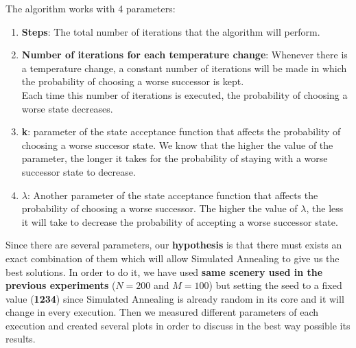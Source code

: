 \documentclass[12]{article}
\begin{document}
The algorithm works with 4 parameters:
\begin{enumerate}
\item \textbf{Steps}: The total number of iterations that the algorithm will perform. 
\item \textbf{Number of iterations for each temperature change}: Whenever there is a temperature change, a constant number of iterations will be made in which the probability of choosing a worse successor is kept. 
\\
Each time this number of iterations is executed, the probability of choosing a worse state decreases. 
\item \textbf{k}: parameter of the state acceptance function that affects the probability of choosing a worse succesor state. We know that the higher the value of the parameter, the longer it takes for the probability of staying with a worse successor state to decrease. 

\item \textbf{$\lambda$}: Another parameter of the state acceptance function that affects the probability of choosing a worse successor. The higher the value of $\lambda$, the less it will take to decrease the probability of accepting a worse successor state. 


\end{enumerate}


Since there are several parameters, our \textbf{hypothesis} is that there must exists an exact combination of them which will allow Simulated Annealing to give us the best solutions. In order to do it, we have used \textbf{same scenery used in the previous experiments} ($N=200$ and $M=100$) but setting the seed to a fixed value (\textbf{1234}) since Simulated Annealing is already random in its core and it will change in every execution. Then we measured different parameters of each execution and created several plots in order to discuss in the best way possible its results. 
\end{document}
